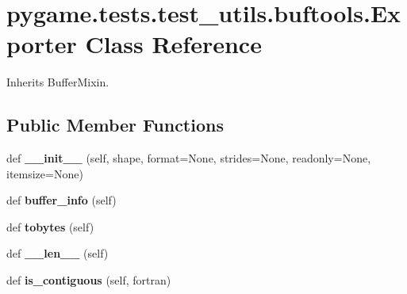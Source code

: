 \hypertarget{classpygame_1_1tests_1_1test__utils_1_1buftools_1_1_exporter}{}\section{pygame.\+tests.\+test\+\_\+utils.\+buftools.\+Exporter Class Reference}
\label{classpygame_1_1tests_1_1test__utils_1_1buftools_1_1_exporter}


Inherits Buffer\+Mixin.

\subsection*{Public Member Functions}
\begin{DoxyCompactItemize}
\item 
\mbox{\label{classpygame_1_1tests_1_1test__utils_1_1buftools_1_1_exporter_a2df33ea2b2ff2eea75a3f89c60943d74}} 
def {\bfseries \+\_\+\+\_\+init\+\_\+\+\_\+} (self, shape, format=None, strides=None, readonly=None, itemsize=None)
\item 
\mbox{\label{classpygame_1_1tests_1_1test__utils_1_1buftools_1_1_exporter_a1ad8a70f1c4ebf76156a38bc37f16570}} 
def {\bfseries buffer\+\_\+info} (self)
\item 
\mbox{\label{classpygame_1_1tests_1_1test__utils_1_1buftools_1_1_exporter_aac42afb6a6fffa4162f422df244a5263}} 
def {\bfseries tobytes} (self)
\item 
\mbox{\label{classpygame_1_1tests_1_1test__utils_1_1buftools_1_1_exporter_ab79c4c0b8ac40493bbd7554d045003ac}} 
def {\bfseries \+\_\+\+\_\+len\+\_\+\+\_\+} (self)
\item 
\mbox{\label{classpygame_1_1tests_1_1test__utils_1_1buftools_1_1_exporter_ac79e9a6d2ef4e9137270dfbc19e94718}} 
def {\bfseries is\+\_\+contiguous} (self, fortran)
\end{DoxyCompactItemize}
